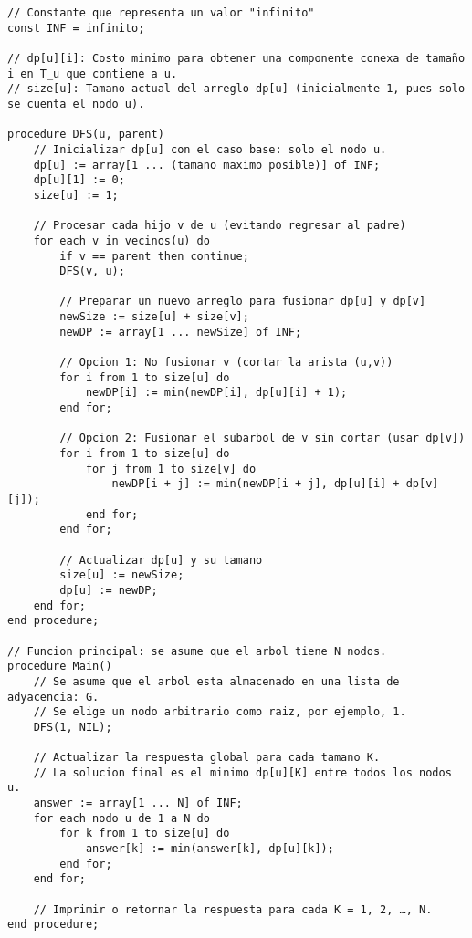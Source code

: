 \begin{lstlisting}[caption={Pseudocódigo en \(O(N^2)\)}]
// Constante que representa un valor "infinito"
const INF = infinito;  

// dp[u][i]: Costo minimo para obtener una componente conexa de tamaño i en T_u que contiene a u.
// size[u]: Tamano actual del arreglo dp[u] (inicialmente 1, pues solo se cuenta el nodo u).

procedure DFS(u, parent)
    // Inicializar dp[u] con el caso base: solo el nodo u.
    dp[u] := array[1 ... (tamano maximo posible)] of INF;
    dp[u][1] := 0;
    size[u] := 1;

    // Procesar cada hijo v de u (evitando regresar al padre)
    for each v in vecinos(u) do
        if v == parent then continue;
        DFS(v, u);

        // Preparar un nuevo arreglo para fusionar dp[u] y dp[v]
        newSize := size[u] + size[v];
        newDP := array[1 ... newSize] of INF;

        // Opcion 1: No fusionar v (cortar la arista (u,v))
        for i from 1 to size[u] do
            newDP[i] := min(newDP[i], dp[u][i] + 1);
        end for;

        // Opcion 2: Fusionar el subarbol de v sin cortar (usar dp[v])
        for i from 1 to size[u] do
            for j from 1 to size[v] do
                newDP[i + j] := min(newDP[i + j], dp[u][i] + dp[v][j]);
            end for;
        end for;

        // Actualizar dp[u] y su tamano
        size[u] := newSize;
        dp[u] := newDP;
    end for;
end procedure;

// Funcion principal: se asume que el arbol tiene N nodos.
procedure Main()
    // Se asume que el arbol esta almacenado en una lista de adyacencia: G.
    // Se elige un nodo arbitrario como raiz, por ejemplo, 1.
    DFS(1, NIL);

    // Actualizar la respuesta global para cada tamano K.
    // La solucion final es el minimo dp[u][K] entre todos los nodos u.
    answer := array[1 ... N] of INF;
    for each nodo u de 1 a N do
        for k from 1 to size[u] do
            answer[k] := min(answer[k], dp[u][k]);
        end for;
    end for;

    // Imprimir o retornar la respuesta para cada K = 1, 2, …, N.
end procedure;
\end{lstlisting}

% 
